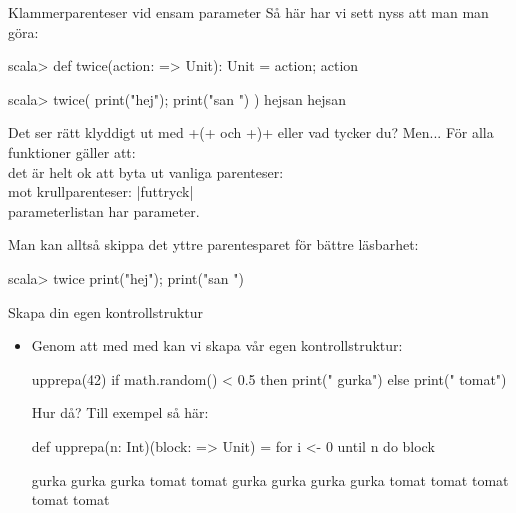 \begin{Slide}{Klammerparenteser vid ensam parameter}
Så här har vi sett nyss att man man göra:
\begin{REPL}
scala> def twice(action: => Unit): Unit = { action; action }

scala> twice( { print("hej"); print("san ") } )
hejsan hejsan
\end{REPL}

Det ser rätt klyddigt ut med \code+{(+  och \code+)}+ eller vad tycker du? \pause Men...
För alla funktioner  gäller att: \\ det är helt ok att byta ut vanliga parenteser: \hfill{} \\ mot krullparenteser: \hfill\code|f{uttryck}| \\  parameterlistan har  parameter.

\vspace{0.5em}Man kan alltså skippa det yttre parentesparet för bättre läsbarhet:
\begin{REPLnonum}
scala> twice { print("hej"); print("san ") }
\end{REPLnonum}
\end{Slide}



\begin{Slide}{Skapa din egen kontrollstruktur}
\begin{itemize}
\item Genom att   med  med  kan vi skapa vår egen kontrollstruktur:  \pause
\begin{Code}
upprepa(42){
  if math.random() < 0.5 then print(" gurka")
  else print(" tomat")
}
\end{Code}
Hur då?
\pause
 Till exempel så här:
\begin{Code}
def upprepa(n: Int)(block: => Unit) = 
  for i <- 0 until n do block
\end{Code}

\pause

\begin{REPLnonum}
gurka gurka gurka tomat tomat gurka gurka gurka gurka tomat tomat tomat tomat tomat
\end{REPLnonum}
\end{itemize}
\end{Slide}



